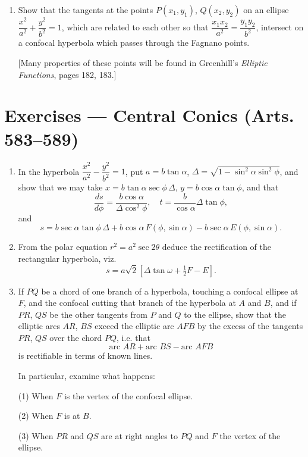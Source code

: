 \documentclass[11pt, a4paper]{article}
\begin{document}
\begin{enumerate}[leftmargin=2em]
\item Show that the tangents at the points $P(x_1,y_1)$, $Q(x_2,y_2)$ on an ellipse $\dfrac{x^2}{a^2}+\dfrac{y^2}{b^2}=1$, which are related to each other so that $\dfrac{x_1x_2}{a^2}=\dfrac{y_1y_2}{b^2}$, intersect on a confocal hyperbola which passes through the Fagnano points.

[Many properties of these points will be found in Greenhill's \textit{Elliptic Functions}, pages 182, 183.]

\end{enumerate}

\section*{Exercises --- Central Conics (Arts. 583--589)}

\begin{enumerate}[leftmargin=2em]

\item In the hyperbola $\dfrac{x^2}{a^2}-\dfrac{y^2}{b^2}=1$, put $a=b\tan\alpha$, $\Delta=\sqrt{1-\sin^2\alpha\sin^2\phi}$, and show that we may take $x=b\tan\alpha\sec\phi\,\Delta$, $y=b\cos\alpha\tan\phi$, and that
\[
\frac{ds}{d\phi}=\frac{b\cos\alpha}{\Delta\cos^2\phi},\quad t=\frac{b}{\cos\alpha}\Delta\tan\phi,
\]
and
\[
s=b\sec\alpha\tan\phi\,\Delta+b\cos\alpha\,F(\phi,\sin\alpha)-b\sec\alpha\,E(\phi,\sin\alpha).
\]

\item From the polar equation $r^2=a^2\sec2\theta$ deduce the rectification of the rectangular hyperbola, viz.
\[
s=a\sqrt2[\Delta\tan\omega+\tfrac12F-E].
\]

\item If $PQ$ be a chord of one branch of a hyperbola, touching a confocal ellipse at $F$, and the confocal cutting that branch of the hyperbola at $A$ and $B$, and if $PR$, $QS$ be the other tangents from $P$ and $Q$ to the ellipse, show that the elliptic arcs $AR$, $BS$ exceed the elliptic arc $AFB$ by the excess of the tangents $PR$, $QS$ over the chord $PQ$, i.e. that
\[
\text{arc }AR+\text{arc }BS-\text{arc }AFB
\]
is rectifiable in terms of known lines.

In particular, examine what happens:

(1) When $F$ is the vertex of the confocal ellipse.

(2) When $F$ is at $B$.

(3) When $PR$ and $QS$ are at right angles to $PQ$ and $F$ the vertex of the ellipse.

\end{enumerate}
\end{document}
